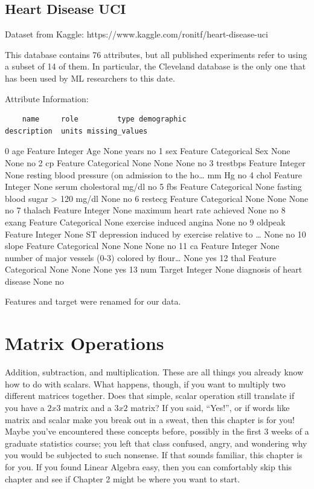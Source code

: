 \documentclass[
  letterpaper,
]{krantz}
\begin{document}
\section{Heart Disease UCI}\label{sec-dd-heart-disease-uci}

Dataset from Kaggle: https://www.kaggle.com/ronitf/heart-disease-uci

This database contains 76 attributes, but all published experiments
refer to using a subset of 14 of them. In particular, the Cleveland
database is the only one that has been used by ML researchers to this
date.

Attribute Information:

\begin{verbatim}
    name     role         type demographic                                        description  units missing_values
\end{verbatim}

0 age Feature Integer Age None years no 1 sex Feature Categorical Sex
None None no 2 cp Feature Categorical None None None no 3 trestbps
Feature Integer None resting blood pressure (on admission to the
ho\ldots{} mm Hg no 4 chol Feature Integer None serum cholestoral mg/dl
no 5 fbs Feature Categorical None fasting blood sugar \textgreater{} 120
mg/dl None no 6 restecg Feature Categorical None None None no 7 thalach
Feature Integer None maximum heart rate achieved None no 8 exang Feature
Categorical None exercise induced angina None no 9 oldpeak Feature
Integer None ST depression induced by exercise relative to \ldots{} None
no 10 slope Feature Categorical None None None no 11 ca Feature Integer
None number of major vessels (0-3) colored by flour\ldots{} None yes 12
thal Feature Categorical None None None yes 13 num Target Integer None
diagnosis of heart disease None no

Features and target were renamed for our data.

\chapter{Matrix Operations}\label{matrix-operations}

Addition, subtraction, and multiplication. These are all things you
already know how to do with scalars. What happens, though, if you want
to multiply two different matrices together. Does that simple, scalar
operation still translate if you have a \(2x3\) matrix and a \(3x2\)
matrix? If you said, ``Yes!'', or if words like matrix and scalar make
you break out in a sweat, then this chapter is for you! Maybe you've
encountered these concepts before, possibly in the first 3 weeks of a
graduate statistics course; you left that class confused, angry, and
wondering why you would be subjected to such nonsense. If that sounds
familiar, this chapter is for you. If you found Linear Algebra easy,
then you can comfortably skip this chapter and see if Chapter 2 might be
where you want to start.
\end{document}
